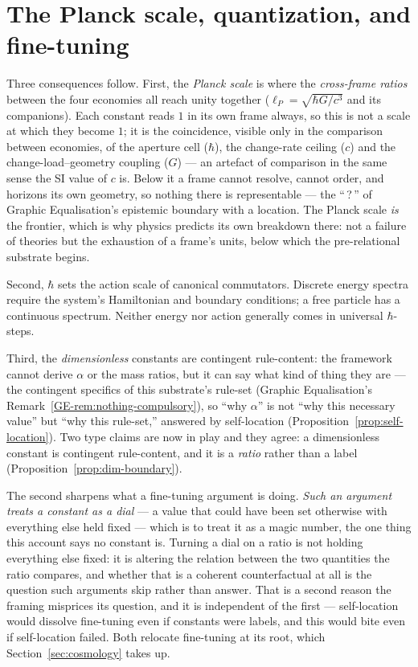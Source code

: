 \documentclass[11pt,a4paper]{article}
\theoremstyle{remark}\newtheorem{remark}[definition]{Remark}
\begin{document}
\section{The Planck scale, quantization, and fine-tuning}\label{sec:planck}
Three consequences follow. First, the \emph{Planck scale} is where the
\emph{cross-frame ratios} between the four economies all reach unity together
($\ell_P=\sqrt{\hbar G/c^{3}}$ and its companions). Each constant reads $1$ in its own
frame always, so this is not a scale at which they become $1$; it is the coincidence,
visible only in the comparison between economies, of the aperture cell ($\hbar$), the
change-rate ceiling ($c$) and the change-load--geometry coupling ($G$) --- an artefact of
comparison in the same sense the SI value of $c$ is. Below it a
frame cannot resolve, cannot order, and horizons its own geometry, so nothing
there is representable --- the ``\,?\,'' of Graphic Equalisation's epistemic
boundary with a location. The Planck scale \emph{is} the frontier, which is why
physics predicts its own breakdown there: not a failure of theories but the
exhaustion of a frame's units, below which the pre-relational substrate begins.

Second, $\hbar$ sets the action scale of canonical commutators. Discrete
energy spectra require the system's Hamiltonian and boundary conditions; a
free particle has a continuous spectrum. Neither energy nor action generally
comes in universal $\hbar$-steps.

Third, the \emph{dimensionless} constants are contingent rule-content: the
framework cannot derive $\alpha$ or the mass ratios, but it can say what kind of
thing they are --- the contingent specifics of this substrate's rule-set (Graphic
Equalisation's Remark~\ref{GE-rem:nothing-compulsory}), so ``why $\alpha$'' is not ``why this necessary
value'' but ``why this rule-set,'' answered by self-location
(Proposition~\ref{prop:self-location}). Two type claims are now in play and they agree: a
dimensionless constant is contingent rule-content, and it is a \emph{ratio} rather than a label
(Proposition~\ref{prop:dim-boundary}).

The second sharpens what a fine-tuning argument is doing. \emph{Such an argument treats a constant as
a dial} --- a value that could have been set otherwise with everything else held fixed --- which is
to treat it as a magic number, the one thing this account says no constant is. Turning a dial on a
ratio is not holding everything else fixed: it is altering the relation between the two quantities
the ratio compares, and whether that is a coherent counterfactual at all is the question such
arguments skip rather than answer. That is a second reason the framing misprices its question, and it
is independent of the first --- self-location would dissolve fine-tuning even if constants were
labels, and this would bite even if self-location failed. Both relocate fine-tuning at its root,
which Section~\ref{sec:cosmology} takes up.
\end{document}
